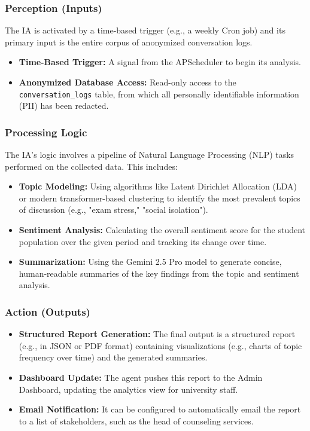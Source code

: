 \subsubsection{Perception (Inputs)}
The IA is activated by a time-based trigger (e.g., a weekly Cron job) and its primary input is the entire corpus of anonymized conversation logs.
\begin{itemize}
    \item \textbf{Time-Based Trigger:} A signal from the APScheduler to begin its analysis.
    \item \textbf{Anonymized Database Access:} Read-only access to the \texttt{conversation\_logs} table, from which all personally identifiable information (PII) has been redacted.
\end{itemize}

\subsubsection{Processing Logic}
The IA's logic involves a pipeline of Natural Language Processing (NLP) tasks performed on the collected data. This includes:
\begin{itemize}
    \item \textbf{Topic Modeling:} Using algorithms like Latent Dirichlet Allocation (LDA) or modern transformer-based clustering to identify the most prevalent topics of discussion (e.g., "exam stress," "social isolation").
    \item \textbf{Sentiment Analysis:} Calculating the overall sentiment score for the student population over the given period and tracking its change over time.
    \item \textbf{Summarization:} Using the Gemini 2.5 Pro model to generate concise, human-readable summaries of the key findings from the topic and sentiment analysis.
\end{itemize}

\subsubsection{Action (Outputs)}
\begin{itemize}
    \item \textbf{Structured Report Generation:} The final output is a structured report (e.g., in JSON or PDF format) containing visualizations (e.g., charts of topic frequency over time) and the generated summaries.
    \item \textbf{Dashboard Update:} The agent pushes this report to the Admin Dashboard, updating the analytics view for university staff.
    \item \textbf{Email Notification:} It can be configured to automatically email the report to a list of stakeholders, such as the head of counseling services.
\end{itemize}

